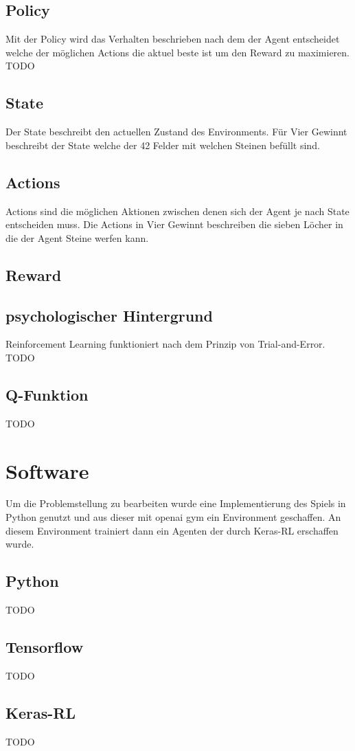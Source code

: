 \subsection{Policy}
Mit der Policy wird das Verhalten beschrieben nach dem der Agent entscheidet welche der möglichen Actions die aktuel beste ist um den Reward zu maximieren.\\
TODO %

\subsection{State}
Der State beschreibt den actuellen Zustand des Environments.
Für Vier Gewinnt beschreibt der State welche der 42 Felder mit welchen Steinen befüllt sind. 

\subsection{Actions}
Actions sind die möglichen Aktionen zwischen denen sich der Agent je nach State entscheiden muss.
Die Actions in Vier Gewinnt beschreiben die sieben Löcher in die der Agent Steine werfen kann.

\subsection{Reward}

\subsection{psychologischer Hintergrund}
Reinforcement Learning funktioniert nach dem Prinzip von Trial-and-Error.\\
TODO %

\subsection{Q-Funktion}
TODO %


\section{Software}
Um die Problemstellung zu bearbeiten wurde eine Implementierung des Spiels in Python genutzt und aus dieser mit openai gym ein Environment geschaffen. An diesem Environment trainiert dann ein Agenten der durch Keras-RL erschaffen wurde.

\subsection{Python}
TODO
\subsection{Tensorflow}
TODO
\subsection{Keras-RL}
TODO